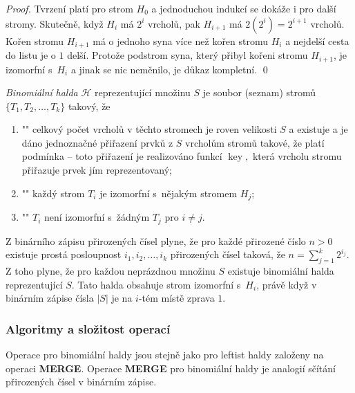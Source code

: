 \documentclass[a4paper,12pt]{article}
\DeclareMathOperator*{\key}{key}
\begin{document}
\begin{proof}Tvrzení platí pro strom $H_0$ a 
jednoduchou indukcí se dokáže i pro další stromy. 
Skutečně, když $H_i$ má $2^i$ vrcholů, pak $H_{
i+1}$ má 
$2(2^i)=2^{i+1}$ vrcholů. Kořen stromu $H_{i+1}$ má o jednoho 
syna více než kořen stromu $H_i$ a nejdelší cesta do listu je o $
1$ 
delší. Protože podstrom syna, který přibyl kořeni stromu 
$H_{i+1}$, je izomorfní s~$H_i$ a jinak se nic neměnilo, je 
důkaz kompletní. \qed
\end{proof}

\emph{Binomiální} \emph{halda} $\mathcal H$ reprezentující 
množinu $S$ je soubor (seznam) stromů $\{T_1,T_2,\dots
,T_k\}$ 
takový, že 
\begin{enumerate}
\item"{}"
celkový počet vrcholů v těchto stromech je 
roven velikosti $S$ a 
existuje a je dáno jednoznačné přiřazení prvků 
z $S$ vrcholům stromů takové, že platí 
podmínka  -- toto přiřazení je realizováno 
funkcí 
$\key,$ která vrcholu stromu přiřazuje prvek jím reprezentovaný;
\item"{}"
každý strom $T_i$ je izomorfní s~nějakým stromem $H_
j$;
\item"{}"
$T_i$ není izomorfní s~žádným $T_j$ pro $i\ne j$.
\end{enumerate}

Z binárního zápisu přirozených čísel plyne, že 
pro každé přiro\-ze\-né číslo $n>0$ existuje prostá 
posloupnost $i_1,i_2,\dots,i_k$ přiro\-ze\-ných čísel taková, že 
$n=\sum_{j=1}^k2^{i_j}$. Z toho plyne, že pro každou neprázd\-nou 
množinu $S$ existuje binomiální halda repre\-zentující $
S$.
Tato halda obsahuje strom izomorfní s~$H_i$, právě když v 
binárním zápise čísla $|S|$ je na $i$-tém místě zprava $
1$.

\subsubsection{Algoritmy a složitost operací}

Operace pro binomiální haldy jsou  
stejně jako pro leftist haldy založeny na ope\-raci {\bf MER\-GE}. Ope\-race 
{\bf MERGE} pro binomiální haldy je analogií sčítání 
přirozených čísel v binár\-ním zápise.
\end{document}

